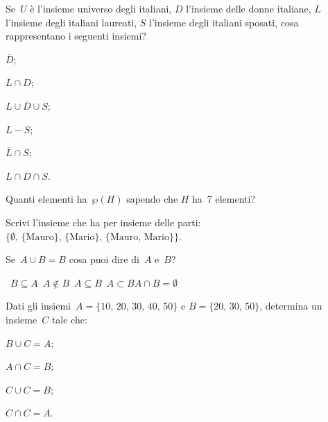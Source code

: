 \begin{esercizio}
\label{ese:\thechapter.119}
Se~$U$ è l'insieme universo degli italiani, $D$ l'insieme delle donne italiane,
$L$ l'insieme degli italiani laureati, $S$ l'insieme degli italiani sposati, cosa rappresentano
i seguenti insiemi?
\begin{multicols}{3}
\begin{enumeratea}
\item $\overline{D}$;
\item $L\cap D$;
\item $\overline{{L\cup D\cup S}}$;
\item $L-S$;
\item $\overline{{L}}\cap S$;
\item $\overline{{L\cap D\cap S}}$.
\end{enumeratea}
\end{multicols}
\end{esercizio}

\begin{esercizio}
\label{ese:\thechapter.120}
Quanti elementi ha~$\wp (H)$ sapendo che $H$ ha~7 elementi?
\end{esercizio}

\begin{esercizio}
\label{ese:\thechapter.121}
Scrivi l'insieme che ha per insieme delle parti:
$\{\emptyset\text{, }\{\text{Mauro}\}\text{, }\{\text{Mario}\}\text{, }\{\text{Mauro, Mario}\}\}$.
\end{esercizio}

\begin{esercizio}
\label{ese:\thechapter.122}
Se~$A\cup B=B$ cosa puoi dire di~$A$ e~$B$?
\begin{center}
 \boxA\quad~$B\subseteq A$\quad\boxB\quad~$A\notin B$\quad\boxC\quad~$A\subseteq B$\quad\boxD\quad~$A\subset B$\quad\boxE\quad$A\cap B=\emptyset $
\end{center}
\end{esercizio}

\begin{esercizio}
\label{ese:\thechapter.123}
Dati gli insiemi~$A=\{\text{10, 20, 30, 40, 50}\}$ e $B=\{\text{20, 30, 50}\}$,
determina un insieme~$C$ tale che:
\begin{multicols}{4}
\begin{enumeratea}
 \item $B\cup C=A$;
 \item $A\cap C=B$;
 \item $C\cup C=B$;
 \item $C\cap C=A$.
\end{enumeratea}
\end{multicols}
\end{esercizio}

